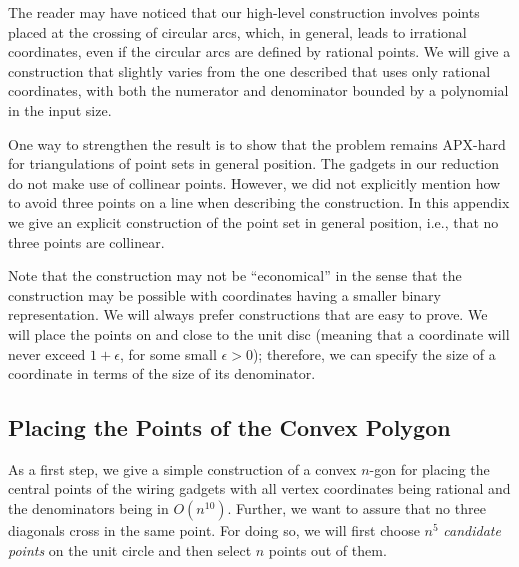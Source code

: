 \documentclass[11pt,a4paper]{article}
\begin{document}
The reader may have noticed that our high-level construction involves points placed at the crossing of circular arcs, which, in general, leads to irrational coordinates, even if the circular arcs are defined by rational points.
We will give a construction that slightly varies from the one described that uses only rational coordinates, with both the numerator and denominator bounded by a polynomial in the input size.

One way to strengthen the result is to show that the problem remains APX-hard for triangulations of point sets in general position.
The gadgets in our reduction do not make use of collinear points.
However, we did not explicitly mention how to avoid three points on a line when describing the construction.
In this appendix we give an explicit construction of the point set in general position, i.e., that no three points are collinear.


Note that the construction may not be ``economical'' in the sense that the construction may be possible with coordinates having a smaller binary representation.
We will always prefer constructions that are easy to prove.
We will place the points on and close to the unit disc (meaning that a coordinate will never exceed $1+\epsilon$, for some small $\epsilon > 0$);
therefore, we can specify the size of a coordinate in terms of the size of its denominator.

\subsection{Placing the Points of the Convex Polygon}


As a first step, we give a simple construction of a convex $n$-gon for placing the central points of the wiring gadgets with all vertex coordinates being rational and the denominators being in $O(n^{10})$.
Further, we want to assure that no three diagonals cross in the same point.
For doing so, we will first choose $n^5$ \emph{candidate points} on the unit circle and then select $n$ points out of them.
\end{document}
